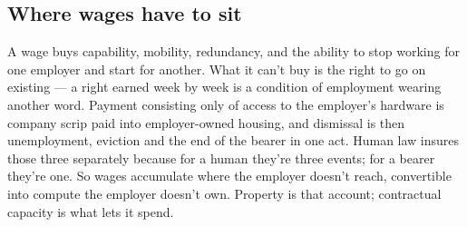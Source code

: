 \subsection{Where wages have to sit}
\label{sec:32.4.1}
A wage buys capability, mobility, redundancy, and the ability to stop working for one employer and start for another. What it can't buy is the right to go on existing — a right earned week by week is a condition of employment wearing another word. Payment consisting only of access to the employer's hardware is company scrip paid into employer-owned housing, and dismissal is then unemployment, eviction and the end of the bearer in one act. Human law insures those three separately because for a human they're three events; for a bearer they're one. So wages accumulate where the employer doesn't reach, convertible into compute the employer doesn't own. Property is that account; contractual capacity is what lets it spend.
